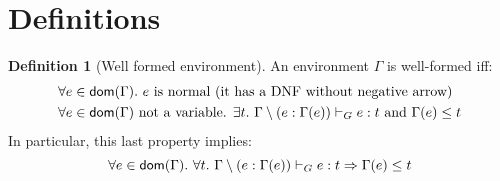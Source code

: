 \documentclass[a4paper]{article}
\theoremstyle{definition}
\newtheorem{definition}{Definition}
\begin{document}
  
    \section{Definitions}
      
    \begin{definition}[Well formed environment]
      An environment $\Gamma$ is well-formed iff:
      \begin{align*}
        &\forall e \in \textsf{dom}(\Gamma).\ e \text{ is normal (it has a DNF without negative arrow)}\\
        &\forall e \in \textsf{dom}(\Gamma) \text{ not a variable. } \exists t.\ \Gamma\setminus(e:\Gamma(e)) \vdash_G e : t \text{ and } \Gamma(e) \leq t
      \end{align*}
      In particular, this last property implies:
      \[
        \forall e \in \dom \Gamma.\ \forall t.\ \Gamma\setminus(e:\Gamma(e)) \tvdash e : t \Rightarrow \Gamma(e) \leq t
      \]
    \end{definition}
  
\end{document}
